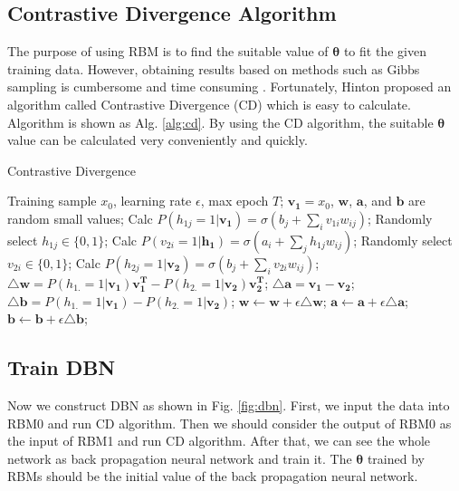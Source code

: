 \documentclass{modified}
\begin{document}
\subsection{Contrastive Divergence Algorithm}
The purpose of using RBM is to find the suitable value of $\boldsymbol{\theta}$ to fit the given training data. However, obtaining results based on methods such as Gibbs sampling is cumbersome and time consuming \cite{zhangchunxia}. Fortunately, Hinton proposed an algorithm called Contrastive Divergence (CD) \cite{Hinton2002Training} which is easy to calculate. Algorithm is shown as Alg. \ref{alg:cd}. By using the CD algorithm, the suitable $\boldsymbol{\theta}$ value can be calculated very conveniently and quickly.
\begin{algorithm}
	\caption{Contrastive Divergence}
	\label{alg:cd}
	\begin{algorithmic}[1]
		\STATE Training sample $x_0$, learning rate $\epsilon$, max epoch $T$;
		\STATE $\mathbf{v_1}=x_0$, $\mathbf{w}$, $\mathbf{a}$, and $\mathbf{b}$ are random small values;
			\STATE Calc $P\left(h_{1j}=1 | \mathbf{v_1} \right)=\sigma\left(b_{j}+\sum_{i} v_{1i} w_{i j}\right)$;
			\STATE Randomly select $h_{1j}\in\{0,1\}$;
		\ENDFOR
			\STATE Calc $P\left(v_{2i}=1 | \mathbf{h_1} \right)=\sigma\left(a_{i}+\sum_{j} h_{1j} w_{i j}\right)$;
			\STATE Randomly select $v_{2i}\in\{0,1\}$;
		\ENDFOR
			\STATE Calc $P\left(h_{2j}=1 | \mathbf{v_2} \right)=\sigma\left(b_{j}+\sum_{i} v_{2i} w_{i j}\right)$;
		\ENDFOR
		\STATE $\mathbf{\triangle w}=P(h_{1.}=1|\mathbf{v_1})\mathbf{v_1^T}-P(h_{2.}=1|\mathbf{v_2})\mathbf{v_2^T}$;
		\STATE $\mathbf{\triangle a}=\mathbf{v_1}-\mathbf{v_2}$;
		\STATE $\mathbf{\triangle b}=P(h_{1.}=1|\mathbf{v_1})-P(h_{2.}=1|\mathbf{v_2})$;
		\STATE $\mathbf{w}\leftarrow \mathbf{w}+\epsilon\triangle\mathbf{w}$;
		\STATE $\mathbf{a}\leftarrow \mathbf{a}+\epsilon\triangle\mathbf{a}$;
		\STATE $\mathbf{b}\leftarrow \mathbf{b}+\epsilon\triangle\mathbf{b}$;
		\ENDFOR
	\end{algorithmic} 
\end{algorithm} 
\subsection{Train DBN}
Now we construct DBN as shown in Fig. \ref{fig:dbn}. First, we input the data into RBM0 and run CD algorithm. Then we should consider the output of RBM0 as the input of RBM1 and run CD algorithm. After that, we can see the whole network as back propagation neural network and train it. The $\boldsymbol{\theta}$ trained by RBMs should be the initial value of the back propagation neural network.
\end{document}
